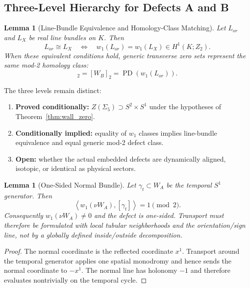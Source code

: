\documentclass[11pt]{article}
\theoremstyle{canonmath}
\newtheorem{lemma}[theorem]{Lemma}
\theoremstyle{canonpostulate}
\theoremstyle{canonclaim}
\providecommand{\Klein}{\mathcal{K}}
\providecommand{\Ztwo}{\mathbb{Z}_2}
\providecommand{\Sone}{S^1}
\providecommand{\Lor}{\mathcal L_{\mathrm{or}}}
\def\mathrm#1{#1}%
\def\mathbb#1{#1}%
\def\mathcal#1{#1}%
\begin{document}
\subsection{Three-Level Hierarchy for Defects A and B}

\begin{lemma}[Line-Bundle Equivalence and Homology-Class Matching] \label{lem:wall_identification}
Let $\Lor$ and $L_X$ be real line bundles on $\Klein$. Then
\begin{equation}
\Lor\cong L_X
\quad\Longleftrightarrow\quad
w_1(\Lor)=w_1(L_X)\in H^1(\Klein;\Ztwo).
\end{equation}
When these equivalent conditions hold, generic transverse zero sets represent the same mod-2 homology class:
\begin{equation}
[W_A]_2=[W_B]_2=\operatorname{PD}\!\left(w_1(\Lor)\right).
\end{equation}
\end{lemma}

The three levels remain distinct:
\begin{enumerate}
\item \textbf{Proved conditionally:} $Z(\Sigma_5)\supset S^2\times S^1$ under the hypotheses of Theorem~\ref{thm:wall_zero}.
\item \textbf{Conditionally implied:} equality of $w_1$ classes implies line-bundle equivalence and equal generic mod-2 defect class.
\item \textbf{Open:} whether the actual embedded defects are dynamically aligned, isotopic, or identical as physical sectors.
\end{enumerate}

\begin{lemma}[One-Sided Normal Bundle] \label{lem:onesided}
Let $\gamma_t\subset W_A$ be the temporal $\Sone$ generator. Then
\begin{equation}
\left\langle w_1(\nu W_A),[\gamma_t]\right\rangle=1\pmod2.
\end{equation}
Consequently $w_1(\nu W_A)\neq0$ and the defect is one-sided. Transport must therefore be formulated with local tubular neighborhoods and the orientation/sign line, not by a globally defined inside/outside decomposition.
\end{lemma}
\begin{proof}
The normal coordinate is the reflected coordinate $x^1$. Transport around the temporal generator applies one spatial monodromy and hence sends the normal coordinate to $-x^1$. The normal line has holonomy $-1$ and therefore evaluates nontrivially on the temporal cycle.
\end{proof}
\end{document}
